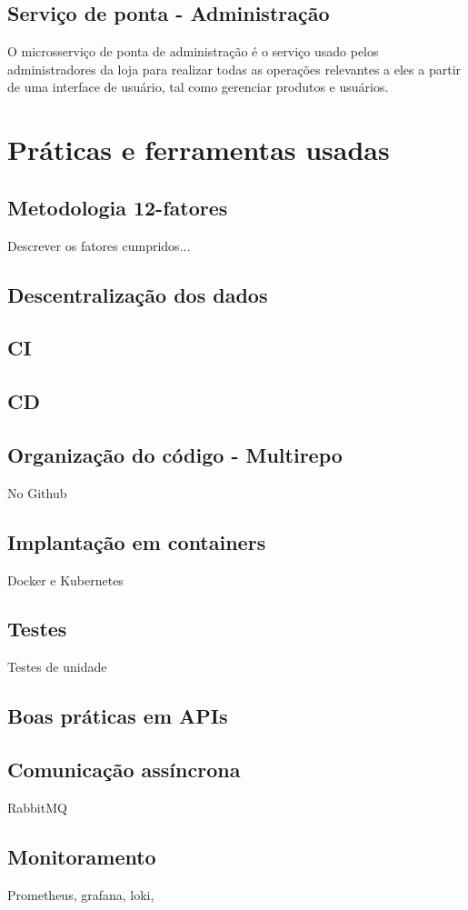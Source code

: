 \subsection*{Serviço de ponta - Administração}
O microsserviço de ponta de administração é o serviço usado pelos administradores da loja para realizar todas as operações relevantes a eles a partir de uma interface de usuário, tal como gerenciar produtos e usuários.

\section{Práticas e ferramentas usadas}

\subsection*{Metodologia 12-fatores}
Descrever os fatores cumpridos...

\subsection*{Descentralização dos dados}

\subsection*{CI}

\subsection*{CD}

\subsection*{Organização do código - Multirepo}
No Github

\subsection*{Implantação em containers}
Docker e Kubernetes

\subsection*{Testes}
Testes de unidade

\subsection*{Boas práticas em APIs}

\subsection*{Comunicação assíncrona}
RabbitMQ

\subsection*{Monitoramento}
Prometheus, grafana, loki,